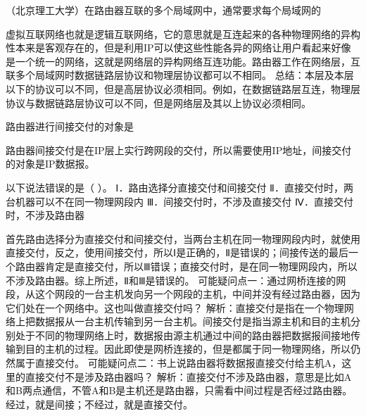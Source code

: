 \question （北京理工大学）在路由器互联的多个局域网中，通常要求每个局域网的
\par{}
\begin{solution}虚拟互联网络也就是逻辑互联网络，它的意思就是互连起来的各种物理网络的异构性本来是客观存在的，但是利用IP可以使这些性能各异的网络让用户看起来好像是一个统一的网络，这就是网络层的异构网络互连功能。路由器工作在网络层，互联多个局域网时数据链路层协议和物理层协议都可以不相同。
总结：本层及本层以下的协议可以不同，但是高层协议必须相同。例如，在数据链路层互连，物理层协议与数据链路层协议可以不同，但是网络层及其以上协议必须相同。
\end{solution}
\question 路由器进行间接交付的对象是
\par{}
\begin{solution}路由器间接交付是在IP层上实行跨网段的交付，所以需要使用IP地址，间接交付的对象是IP数据报。
\end{solution}
\question 以下说法错误的是（ ）。 Ⅰ．路由选择分直接交付和间接交付
Ⅱ．直接交付时，两台机器可以不在同一物理网段内
Ⅲ．间接交付时，不涉及直接交付 Ⅳ．直接交付时，不涉及路由器
\par{}
\begin{solution}首先路由选择分为直接交付和间接交付，当两台主机在同一物理网段内时，就使用直接交付，反之，使用间接交付，所以Ⅰ是正确的，Ⅱ是错误的；间接传送的最后一个路由器肯定是直接交付，所以Ⅲ错误；直接交付时，是在同一物理网段内，所以不涉及路由器。综上所述，Ⅱ和Ⅲ是错误的。
可能疑问点一：通过网桥连接的网段，从这个网段的一台主机发向另一个网段的主机，中间并没有经过路由器，因为它们处在一个网络中。这也叫做直接交付吗？
解析：直接交付是指在一个物理网络上把数据报从一台主机传输到另一台主机。间接交付是指当源主机和目的主机分别处于不同的物理网络上时，数据报由源主机通过中间的路由器把数据报间接地传输到目的主机的过程。因此即使是网桥连接的，但是都属于同一物理网络，所以仍然属于直接交付。
可能疑问点二：书上说路由器将数据报直接交付给主机A，这里的直接交付不是涉及路由器吗？
解析：直接交付不涉及路由器，意思是比如A和B两点通信，不管A和B是主机还是路由器，只需看中间过程是否经过路由器。经过，就是间接；不经过，就是直接交付。
\end{solution}
